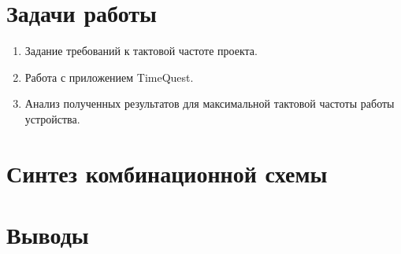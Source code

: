 





\section{Задачи работы}

\begin{enumerate}
\item Задание требований к тактовой частоте проекта.
\item Работа с приложением TimeQuest.
\item Анализ полученных результатов для максимальной тактовой частоты работы устройства.
\end{enumerate}

\section{Синтез комбинационной схемы}

\section{Выводы}

